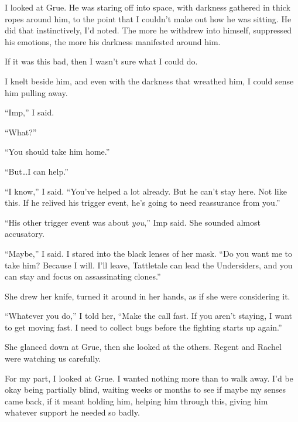 I looked at Grue.  He was staring off into space, with darkness gathered in thick ropes around him, to the point that I couldn't make out how he was sitting.  He did that instinctively, I'd noted.  The more he withdrew into himself, suppressed his emotions, the more his darkness manifested around him.



If it was this bad, then I wasn't sure what I could do.



I knelt beside him, and even with the darkness that wreathed him, I could sense him pulling away.



``Imp,'' I said.



``What?''



``You should take him home.''



``But\ldots I can help.''



``I know,'' I said.  ``You've helped a lot already.  But he can't stay here.  Not like this.  If he relived his trigger event, he's going to need reassurance from you.''



``His other trigger event was about \emph{you},'' Imp said.  She sounded almost accusatory.



``Maybe,'' I said.  I stared into the black lenses of her mask.  ``Do you want me to take him? Because I will.  I'll leave, Tattletale can lead the Undersiders, and you can stay and focus on assassinating clones.''



She drew her knife, turned it around in her hands, as if she were considering it.



``Whatever you do,'' I told her, ``Make the call fast.  If you aren't staying, I want to get moving fast.  I need to collect bugs before the fighting starts up again.''



She glanced down at Grue, then she looked at the others.  Regent and Rachel were watching us carefully.



For my part, I looked at Grue.  I wanted nothing more than to walk away.  I'd be okay being partially blind, waiting weeks or months to see if maybe my senses came back, if it meant holding him, helping him through this, giving him whatever support he needed so badly.



